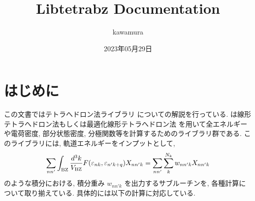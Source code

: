 \documentclass[letterpaper,10pt,dvipdfmx,openany]{sphinxmanual}
\title{Libtetrabz Documentation}
\date{2023年05月29日}
\author{kawamura}
\begin{document}
\pagestyle{empty}
\sphinxmaketitle
\pagestyle{plain}
\sphinxtableofcontents
\pagestyle{normal}
\label{\detokenize{index::doc}}


\sphinxstepscope


\chapter{はじめに}
\label{\detokenize{overview:id1}}\label{\detokenize{overview::doc}}
\sphinxAtStartPar
この文書ではテトラへドロン法ライブラリ  についての解説を行っている.
 は線形テトラへドロン法もしくは最適化線形テトラへドロン法 {\hyperref[\detokenize{ref:ref}]{}}
を用いて全エネルギーや電荷密度, 部分状態密度,
分極関数等を計算するためのライブラリ群である.
このライブラリには, 軌道エネルギーをインプットとして,
\begin{equation*}
\begin{split}\begin{align}
\sum_{n n'} \int_{\rm BZ} \frac{d^3 k}{V_{\rm BZ}} F(\varepsilon_{n k}, \varepsilon_{n' k+q})X_{n n' k}
= \sum_{n n'} \sum_{k}^{N_k} w_{n n' k} X_{n n' k}
\end{align}\end{split}
\end{equation*}
\sphinxAtStartPar
のような積分における, 積分重み \(w_{n n' k}\) を出力するサブルーチンを,
各種計算について取り揃えている. 具体的には以下の計算に対応している.
\end{document}
